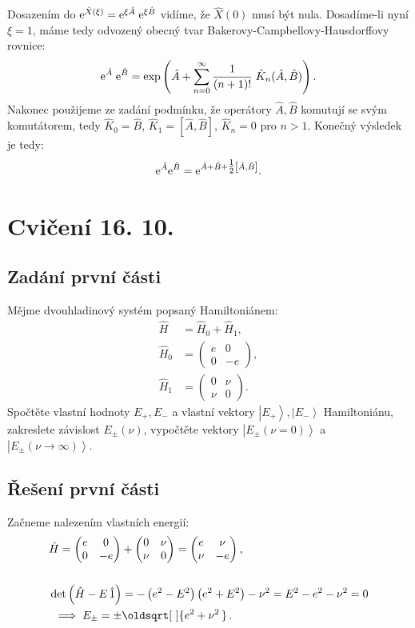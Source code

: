 \documentclass[10pt,a4paper]{article}
\renewcommand*{\sqrt}[2][\ ]{\oldsqrt[#1]{#2\,}\,}
\newcommand{\comm}[2]{\left[ #1, #2 \right]}
\newcommand{\const}[1]{\text{\rmfamily\upshape #1}}
\newcommand{\mat}[1]{
    \begin{pmatrix}
        #1
    \end{pmatrix}
}
\newcommand{\ket}[1]{\left| #1 \right>}
\newcommand{\e}[1]{\const{e}^{#1}}
\begin{document}
Dosazením do $\e{\hat X(\xi)} = \e{\xi \hat A} \; \e{\xi \hat B}$ vidíme, že $\hat X(0)$ musí být nula. Dosadíme-li nyní $\xi=1$, máme tedy odvozený obecný tvar Bakerovy-Campbellovy-Hausdorffovy rovnice:
\begin{align*}
    \e{\hat A} \; \e{\hat B} = \exp \left(
        \hat A + \sum_{n=0}^\infty \frac{1}{(n+1)!} \; \hat K_n(\hat A, \hat B)
    \right).
\end{align*}
Nakonec použijeme ze zadání podmínku, že operátory $\hat A, \hat B$ komutují se svým komutátorem, tedy $\hat K_0 = \hat B$, $\hat K_1 = \comm{\hat A}{\hat B}$, $\hat K_n = 0$ pro $n>1$. Konečný výsledek je tedy:
\begin{align*}
    \e{\hat A}\e{\hat B} = \e{\hat A + \hat B + \tfrac{1}{2} \comm{\hat A}{\hat B}}.
\end{align*}


\pagebreak
\section{Cvičení 16. 10.}

\subsection{Zadání první části}
Mějme dvouhladinový systém popsaný Hamiltoniánem:
\begin{align*}
    \hat H &= \hat H_0 + \hat H_1,
    \\[5pt]
    \hat H_0 &= \mat{e & 0 \\ 0 & -e},
    \\[5pt]
    \hat H_1 &= \mat{0 & \nu \\ \nu & 0}.
\end{align*}
Spočtěte vlastní hodnoty $E_{+}, E_{-}$ a vlastní vektory $\ket{E_{+}}, \ket{E_{-}}$ Hamiltoniánu, zakreslete závislost $E_{\pm}(\nu)$, vypočtěte vektory $\ket{E_{\pm}(\nu=0)}$ a $\ket{E_{\pm}(\nu\to\infty)}$.

\subsection{Řešení první části}
Začneme nalezením vlastních energií:
\begin{align*}
    &\hat H
    = \mat{ e & 0 \\ 0 & -e } + \mat{ 0 & \nu \\ \nu & 0 }
    = \mat{ e & \nu \\ \nu & -e },
    \\[15pt]
    &\det\left( \hat H - E \, \hat 1 \right)
    = -\left( e^2 - E^2 \right) \left( e^2 + E^2 \right) - \nu^2
    = E^2 - e^2 - \nu^2
    = 0
    \\
    & \; \implies E_{\pm} = \pm \sqrt{ e^2 + \nu^2 }.
    \\
\end{align*}
\end{document}
